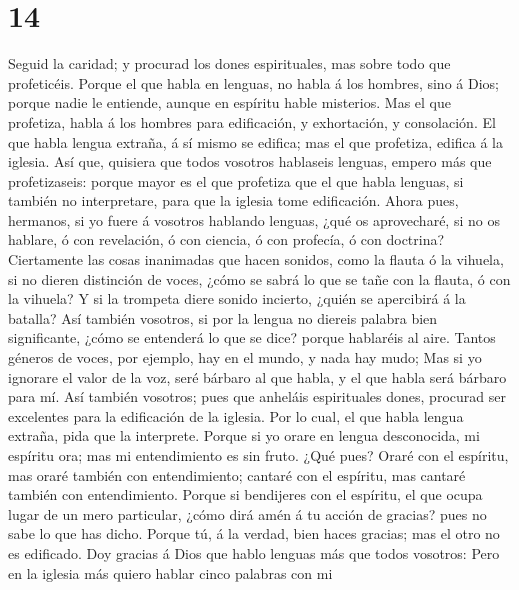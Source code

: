 \hypertarget{section-13}{%
\section{14}\label{section-13}}

 Seguid la caridad; y procurad los dones espirituales, mas
sobre todo que profeticéis.  Porque el que habla en lenguas,
no habla á los hombres, sino á Dios; porque nadie le entiende, aunque en
espíritu hable misterios.  Mas el que profetiza, habla á los
hombres para edificación, y exhortación, y consolación.  El
que habla lengua extraña, á sí mismo se edifica; mas el que profetiza,
edifica á la iglesia.  Así que, quisiera que todos vosotros
hablaseis lenguas, empero más que profetizaseis: porque mayor es el que
profetiza que el que habla lenguas, si también no interpretare, para que
la iglesia tome edificación.  Ahora pues, hermanos, si yo
fuere á vosotros hablando lenguas, ¿qué os aprovecharé, si no os
hablare, ó con revelación, ó con ciencia, ó con profecía, ó con
doctrina?  Ciertamente las cosas inanimadas que hacen
sonidos, como la flauta ó la vihuela, si no dieren distinción de voces,
¿cómo se sabrá lo que se tañe con la flauta, ó con la vihuela?
 Y si la trompeta diere sonido incierto, ¿quién se
apercibirá á la batalla?  Así también vosotros, si por la
lengua no diereis palabra bien significante, ¿cómo se entenderá lo que
se dice? porque hablaréis al aire.  Tantos géneros de
voces, por ejemplo, hay en el mundo, y nada hay mudo;  Mas
si yo ignorare el valor de la voz, seré bárbaro al que habla, y el que
habla será bárbaro para mí.  Así también vosotros; pues que
anheláis espirituales dones, procurad ser excelentes para la edificación
de la iglesia.  Por lo cual, el que habla lengua extraña,
pida que la interprete.  Porque si yo orare en lengua
desconocida, mi espíritu ora; mas mi entendimiento es sin fruto.
 ¿Qué pues? Oraré con el espíritu, mas oraré también con
entendimiento; cantaré con el espíritu, mas cantaré también con
entendimiento.  Porque si bendijeres con el espíritu, el
que ocupa lugar de un mero particular, ¿cómo dirá amén á tu acción de
gracias? pues no sabe lo que has dicho.  Porque tú, á la
verdad, bien haces gracias; mas el otro no es edificado. 
Doy gracias á Dios que hablo lenguas más que todos vosotros:
 Pero en la iglesia más quiero hablar cinco palabras con mi
